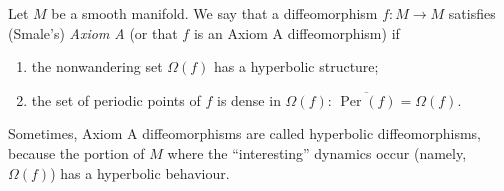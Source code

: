 \documentclass[12pt]{article}
\newcommand{\Per}{\operatorname{Per}}
\begin{document}
Let $M$ be a smooth manifold. We say that a diffeomorphism $f\colon M\to M$ satisfies
(Smale's) \emph{Axiom A} (or that $f$ is an Axiom A diffeomorphism) if
\begin{enumerate}
\item the nonwandering set $\Omega(f)$ has a hyperbolic structure;
\item the set of periodic points of $f$ is dense in $\Omega(f)$: $\overline{\Per(f)} = \Omega(f)$.
\end{enumerate}
Sometimes, Axiom A diffeomorphisms are called hyperbolic diffeomorphisms, because the portion of $M$ where the ``interesting'' dynamics occur (namely, $\Omega(f)$) has a hyperbolic behaviour.
\end{document}
